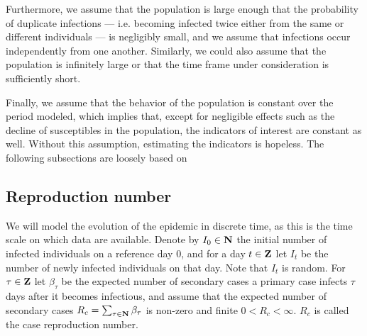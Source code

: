Furthermore, we assume that the population is large enough that the probability of duplicate infections --- i.e. becoming infected twice either from the same or different individuals --- is negligibly small, and we assume that infections occur independently from one another. Similarly, we could also assume that the population is infinitely large or that the time frame under consideration is sufficiently short.

Finally, we assume that the behavior of the population is constant over the period modeled, which implies that, except for negligible effects such as the decline of susceptibles in the population, the indicators of interest are constant as well. Without this assumption, estimating the indicators is hopeless.
The following subsections are loosely based on \citep{Diekmann2013Mathematical,Hotz2020Monitoring}


\subsection{Reproduction number}
\label{subsec:reproduction_number}
We will model the evolution of the epidemic in discrete time, as this is the time scale on which data are available. Denote by $I_{0} \in \mathbf N$ the initial number of infected individuals on a reference day $0$, and for a day $t \in \mathbf Z$ let $I_{t}$ be the number of newly infected individuals on that day. Note that $I_{t}$ is random. For $\tau\in\mathbf Z$ let $\beta_{\tau}$ be the expected number of secondary cases a primary case infects $\tau$ days after it becomes infectious, and assume that the expected number of secondary cases $
R_{c} = \sum_{\tau \in \mathbf N}\beta_{\tau}$ is non-zero and finite $0 < R_{c} < \infty$. $R_{c}$ is called the case reproduction number.  


